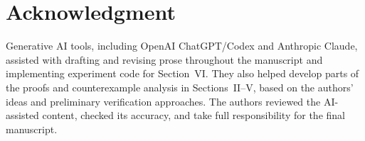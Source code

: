 \section*{Acknowledgment}
Generative AI tools, including OpenAI ChatGPT/Codex and Anthropic
Claude, assisted with drafting and revising prose throughout the
manuscript and implementing experiment code for Section~VI.
They also helped develop parts of the proofs and counterexample
analysis in Sections~II--V, based on the authors' ideas and
preliminary verification approaches. The authors reviewed the AI-assisted
content, checked its accuracy, and take full responsibility
for the final manuscript.
